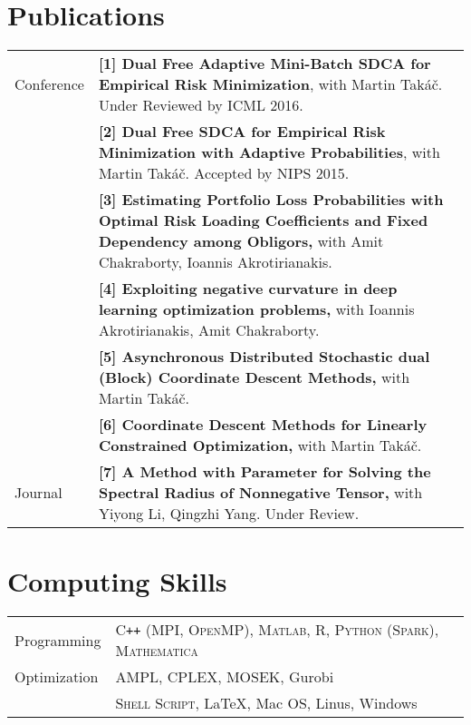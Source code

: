 \documentclass[letters,11pt]{article} %
\begin{document}
\section{Publications}
\begin{longtable}{>{\centering}p{3.3cm}|p{14cm}}
    Conference &
     \textbf{[1] Dual Free Adaptive Mini-Batch SDCA for Empirical Risk Minimization}, with Martin Takáč. Under Reviewed by ICML 2016.\\
    &\textbf{[2] Dual Free SDCA for Empirical Risk Minimization with Adaptive Probabilities}, with Martin Takáč. Accepted by NIPS 2015.\\
    &\textbf{[3] Estimating Portfolio Loss Probabilities with Optimal Risk Loading Coefficients and Fixed Dependency among Obligors,} with Amit Chakraborty, Ioannis Akrotirianakis. \\
        \pagebreak
    &\textbf{[4] Exploiting negative curvature in deep learning optimization problems,} with Ioannis Akrotirianakis, Amit Chakraborty.\\
    &\textbf{[5] Asynchronous Distributed Stochastic dual (Block) Coordinate Descent Methods,} with Martin Takáč. \\
    &\textbf{[6] Coordinate Descent Methods for Linearly Constrained Optimization,} with Martin Takáč.\\
    Journal &\textbf{[7] A Method with Parameter for Solving the Spectral Radius of Nonnegative Tensor,} with Yiyong Li, Qingzhi Yang. Under Review.
\end{longtable}

\section{Computing Skills}
\begin{longtable}{>{\centering}p{3.3cm}|p{14cm}}
    Programming & \textsc{C\texttt{++} (MPI, OpenMP)}, \textsc{Matlab}, \textsc{R}, \textsc{Python (Spark)}, \textsc{Mathematica}\\
    Optimization & AMPL, CPLEX, MOSEK, Gurobi \\
    {Others} &  \textsc{Shell Script}, \LaTeX, Mac OS, Linus, Windows
\end{longtable}
\end{document}
